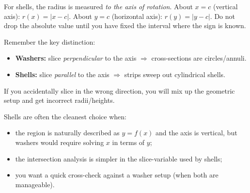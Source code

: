 \begin{commonmistake}[title={Common Mistake: Radius for Shells Is a Distance}]
For shells, the radius is measured \emph{to the axis of rotation}.
About $x=c$ (vertical axis): $r(x)=|x-c|$.
About $y=c$ (horizontal axis): $r(y)=|y-c|$.
Do not drop the absolute value until you have fixed the interval where the sign is known.
\end{commonmistake}

\begin{commonmistake}[title={Common Mistake: Using the wrong slicing direction}]
Remember the key distinction:
\begin{itemize}[leftmargin=*]
\item \textbf{Washers:} slice \emph{perpendicular} to the axis $\Rightarrow$ cross-sections are circles/annuli.
\item \textbf{Shells:} slice \emph{parallel} to the axis $\Rightarrow$ strips sweep out cylindrical shells.
\end{itemize}
If you accidentally slice in the wrong direction, you will mix up the geometric setup and get incorrect radii/heights.
\end{commonmistake}

\begin{examtip}[title={Exam Focus: When Shells Beat Washers}]
Shells are often the cleanest choice when:
\begin{itemize}[leftmargin=*]
\item the region is naturally described as $y=f(x)$ and the axis is vertical, but washers would require solving $x$ in terms of $y$;
\item the intersection analysis is simpler in the slice-variable used by shells;
\item you want a quick cross-check against a washer setup (when both are manageable).
\end{itemize}
\end{examtip}

